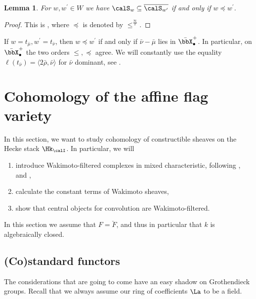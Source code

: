 \documentclass[10pt, reqno]{amsart}
\theoremstyle{plain}
\newtheorem{lemma}[theorem]{Lemma}
\theoremstyle{definition}
\numberwithin{equation}{section}
\begin{document}
	\begin{lemma}
		\label{closure-relations-of-semi-infinite-orbits}
		For $w,w^\prime\in W$ we have $\calS_w\subseteq \overline{\calS_{w^\prime}}$ if and only if $w\preceq w^\prime$.
	\end{lemma}
	\begin{proof}
		This is \cite[Proposition 5.4]{AGLR22}, where $\preceq$ is denoted by $\leq^{\frac{\infty}{2}}$.
	\end{proof}
	
	If $w=t_{\bar{\mu}}, w^\prime=t_{\bar{\nu}}$, then $w\preceq w^\prime$ if and only if $\bar{\nu}-\bar{\mu}$ lies in $\bar{\bbX}_\bullet^+$. 
	In particular, on $\bar{\bbX}_{\bullet}^+$ the two orders $\leq, \preceq$ agree. We will constantly use the equality $\ell(t_{\bar\nu})=\langle 2\bar\rho,\bar\nu\rangle$ for $\bar\nu$ dominant, see \cite[Lemma 9.1]{Zhu14}.
	
	
	
	\section{Cohomology of the affine flag variety}
	\label{sec:cohom-affine-flag}
	
	In this section, we want to study cohomology of constructible sheaves on the Hecke stack $\Hk_\calI$. In particular, we will
	\begin{enumerate}
		\item introduce Wakimoto-filtered complexes in mixed characteristic, following \cite{AB09}, \cite{AR} and \cite{Zhu14},
		\item calculate the constant terms of Wakimoto sheaves,
		\item show that central objects for convolution are Wakimoto-filtered.
	\end{enumerate}
	In this section we assume that $F=\breve{F}$, and thus in particular that $k$ is algebraically closed.
	
	\subsection{(Co)standard functors}
	\label{sec:costandard-functors}
	
	The considerations that are going to come have an easy shadow on Grothendieck groups. Recall that we always assume our ring of coefficients $\La$ to be a field.
	
\end{document}
